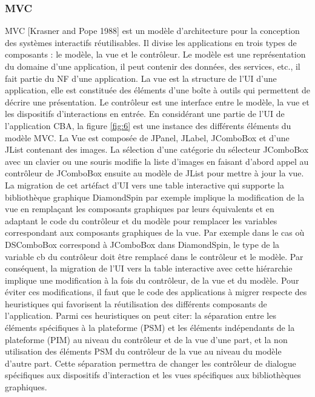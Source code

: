\subsubsection{MVC}
MVC [Krasner and Pope 1988] est un modèle d'architecture pour la conception des systèmes interactifs réutilisables. Il divise les applications en trois types de composants : le modèle, la vue et le contrôleur. Le modèle est une représentation du domaine d'une application, il peut contenir des données, des services, etc., il fait partie du NF d'une application. La vue est la structure de l'UI d'une application, elle est constituée des éléments d'une boîte à outils qui permettent de décrire une présentation. Le contrôleur est une interface entre le modèle, la vue et les dispositifs d'interactions en entrée.
En considérant une partie de l'UI de l'application CBA, la figure \ref{fig:6} est une instance des différents éléments du modèle MVC. La Vue est composée de JPanel, JLabel, JComboBox et d'une JList contenant des images. La sélection d'une catégorie du sélecteur JComboBox  avec un clavier ou une souris modifie la liste d'images en faisant d'abord appel au contrôleur de JComboBox ensuite au modèle de JList pour mettre à jour la vue.
La migration de cet artéfact d'UI vers une table interactive qui supporte la bibliothèque graphique DiamondSpin par exemple implique la modification de la vue en remplaçant les composants graphiques par leurs équivalents et en adaptant le code du contrôleur et du modèle pour remplacer les variables correspondant aux composants graphiques de la vue. Par exemple dans le cas o\`{u} DSComboBox correspond à JComboBox dans DiamondSpin, le type de la variable cb du contr\^{o}leur doit \^{e}tre remplacé dans le contr\^{o}leur et le mod\`{e}le.
Par conséquent, la migration de l'UI vers la table interactive avec cette hiérarchie implique une modification à la fois du contr\^{o}leur, de la vue et du mod\`{e}le. Pour éviter ces modifications, il faut que le code des applications à migrer respecte des heuristiques qui favorisent la réutilisation des différents composants de l'application. Parmi ces heuristiques on peut citer: la séparation entre les éléments spécifiques à la plateforme (PSM) et les éléments indépendants de la plateforme (PIM) au niveau du contr\^{o}leur et de la vue d'une part, et la non utilisation des éléments PSM du contrôleur de la vue au niveau du modèle d'autre part. Cette séparation permettra de changer les contr\^{o}leur de dialogue spécifiques aux dispositifs d'interaction et les vues spécifiques aux biblioth\`{e}ques graphiques.
